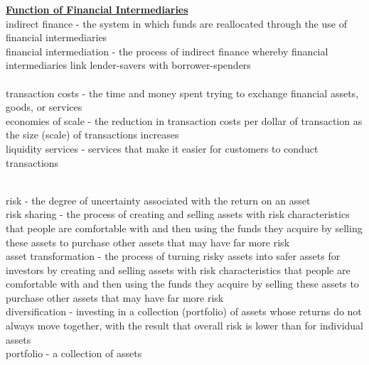 \documentclass[12pt]{article}
\begin{document}
\noindent \underline{\bf Function of Financial Intermediaries}\\

\noindent indirect finance - the system in which funds are reallocated through the use of financial intermediaries\\

\noindent financial intermediation - the process of indirect finance whereby financial intermediaries link lender-savers with borrower-spenders\\

\\

\noindent transaction costs - the time and money spent trying to exchange financial assets, goods, or services\\

\noindent economies of scale - the reduction in transaction costs per dollar of transaction as the size (scale) of transactions increases\\

\noindent liquidity services - services that make it easier for customers to conduct transactions\\

\newpage

\\

\noindent risk - the degree of uncertainty associated with the return on an asset\\

\noindent risk sharing - the process of creating and selling assets with risk characteristics that people are comfortable with and then using the funds 
they acquire by selling these assets to purchase other assets that may have far more risk\\

\noindent asset transformation - the process of turning risky assets into safer assets for investors by creating and selling assets with risk characteristics 
that people are comfortable with and then using the funds they acquire by selling these assets to purchase other assets that may have far more risk\\

\noindent diversification - investing in a collection (portfolio) of assets whose returns do not always move together, with the result that overall risk
is lower than for individual assets\\

\noindent portfolio - a collection of assets\\
\end{document}
